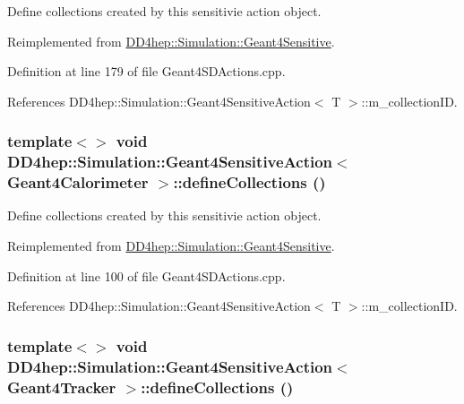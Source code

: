 Define collections created by this sensitivie action object. 

Reimplemented from \hyperlink{class_d_d4hep_1_1_simulation_1_1_geant4_sensitive_a88c872b79e49e399c8ee282960c2d77d}{DD4hep::Simulation::Geant4Sensitive}.

Definition at line 179 of file Geant4SDActions.cpp.

References DD4hep::Simulation::Geant4SensitiveAction$<$ T $>$::m\_\-collectionID.\hypertarget{class_d_d4hep_1_1_simulation_1_1_geant4_sensitive_action_a4c99ecfb911ff6828db0c98b331e2ca5}{
\subsubsection[{defineCollections}]{\setlength{\rightskip}{0pt plus 5cm}template$<$$>$ void {\bf DD4hep::Simulation::Geant4SensitiveAction}$<$ {\bf Geant4Calorimeter} $>$::defineCollections ()}}
\label{class_d_d4hep_1_1_simulation_1_1_geant4_sensitive_action_a4c99ecfb911ff6828db0c98b331e2ca5}


Define collections created by this sensitivie action object. 

Reimplemented from \hyperlink{class_d_d4hep_1_1_simulation_1_1_geant4_sensitive_a88c872b79e49e399c8ee282960c2d77d}{DD4hep::Simulation::Geant4Sensitive}.

Definition at line 100 of file Geant4SDActions.cpp.

References DD4hep::Simulation::Geant4SensitiveAction$<$ T $>$::m\_\-collectionID.\hypertarget{class_d_d4hep_1_1_simulation_1_1_geant4_sensitive_action_a414ca0e288f6b1a298bebda417f5be18}{
\subsubsection[{defineCollections}]{\setlength{\rightskip}{0pt plus 5cm}template$<$$>$ void {\bf DD4hep::Simulation::Geant4SensitiveAction}$<$ {\bf Geant4Tracker} $>$::defineCollections ()}}
\label{class_d_d4hep_1_1_simulation_1_1_geant4_sensitive_action_a414ca0e288f6b1a298bebda417f5be18}


